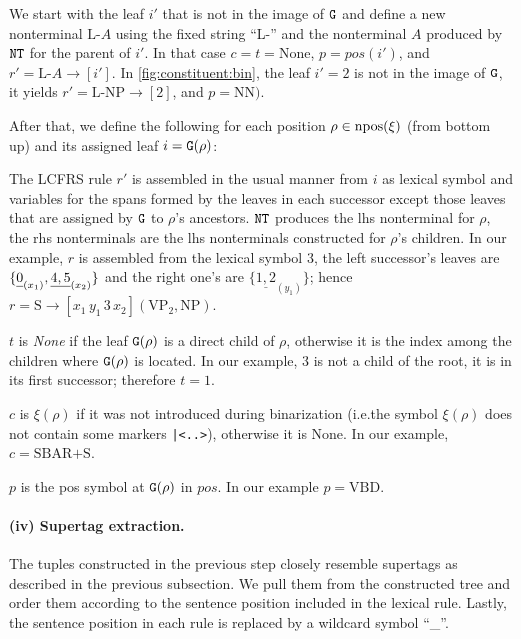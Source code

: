 \documentclass[../../document.tex]{subfiles}
\begin{document}
    We start with the leaf \(i'\) that is not in the image of \(\texttt{G}\) and define a new nonterminal \(\text{L-}A\) using the fixed string ``L-'' and the nonterminal \(A\) produced by \(\texttt{NT}\) for the parent of \(i'\).
    In that case \(c = t = \text{None}\), \(p = \mathit{pos}(i')\), and \(r' = \text{L-}A \to [i']\).
    In \cref{fig:constituent:bin}, the leaf \(i'=2\) is not in the image of \(\texttt{G}\), it yields \(r' = \text{L-NP} \to [2]\), and \(p = \text{NN})\).

    After that, we define the following for each position \(\rho \in \operatorname{npos}(\xi)\) (from bottom up) and its assigned leaf \(i = \texttt{G}(\rho)\):
    \begin{asparaitem}
        \item
        The LCFRS rule \(r'\) is assembled in the usual manner from \(i\) as lexical symbol and variables for the spans formed by the leaves in each successor except those leaves that are assigned by \(\texttt{G}\) to \(\rho\)'s ancestors.
        \(\texttt{NT}\) produces the lhs nonterminal for \(\rho\), the rhs nonterminals are the lhs nonterminals constructed for \(\rho\)'s children.
        In our example, \(r\) is assembled from the lexical symbol \(3\), the left successor's leaves are \(\{\underline{0\vphantom{,}}_{(x_1)}, \underline{4,5} _{(x_2)}\}\) and the right one's are \(\{\underline{1,2} _{(y_1)}\}\);
        hence \(r = \text{S} \to [x_1 \, y_1 \, 3 \, x_2] (\text{VP}_2, \text{NP})\).

        \item
        \(t\) is \emph{None} if the leaf \(\texttt{G}(\rho)\) is a direct child of \(\rho\), otherwise it is the index among the children where \(\texttt{G}(\rho)\) is located.
        In our example, 3 is not a child of the root, it is in its first successor; therefore \(t=1\).

        \item
        \(c\) is \(\xi(\rho)\) if it was not introduced during binarization (i.e.\@ the symbol \(\xi(\rho)\) does not contain some markers \texttt{|<..>}), otherwise it is None.
        In our example, \(c = \text{SBAR+S}\).

        \item
        \(p\) is the pos symbol at \(\texttt{G}(\rho)\) in \(\mathit{pos}\).
        In our example \(p = \text{VBD}\).
    \end{asparaitem}

    \paragraph{(iv) Supertag extraction.}
    The tuples constructed in the previous step closely resemble supertags as described in the previous subsection.
    We pull them from the constructed tree and order them according to the sentence position included in the lexical rule.
    Lastly, the sentence position in each rule is replaced by a wildcard symbol ``\_''.

    \ifSubfilesClassLoaded{%
        \printindex
    }{}
\end{document}
